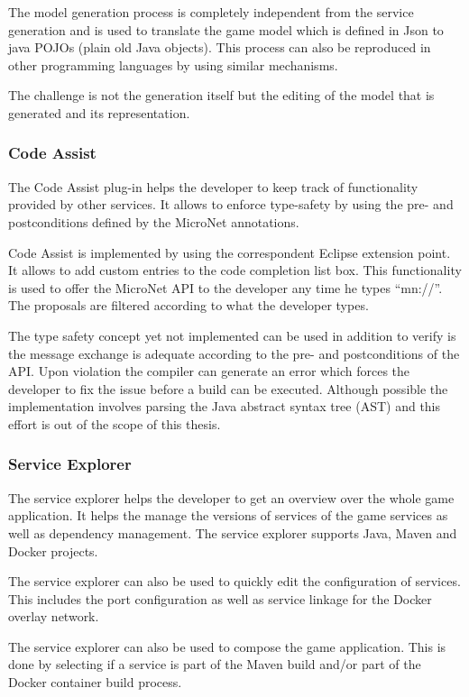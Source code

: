 The model generation process is completely independent from the service
generation and is used to translate the game model which is defined in Json to
java POJOs (plain old Java objects). This process can also be reproduced in
other programming languages by using similar mechanisms. 

The challenge is not the generation itself but the editing of the model that is
generated and its representation. 

\subsubsection{Code Assist}

The Code Assist plug-in helps the developer to keep track of functionality
provided by other services. It allows to enforce type-safety by using the pre-
and postconditions defined by the MicroNet annotations.

Code Assist is implemented by using the correspondent Eclipse extension point.
It allows to add custom entries to the code completion list box. This
functionality is used to offer the MicroNet API to the developer any time he
types ``mn://''. The proposals are filtered according to what the developer
types.

The type safety concept yet not implemented can be used in addition to verify is
the message exchange is adequate according to the pre- and postconditions of the
API. Upon violation the compiler can generate an error which forces the
developer to fix the issue before a build can be executed. Although possible the
implementation involves parsing the Java abstract syntax tree (AST) and this
effort is out of the scope of this thesis.

\subsubsection{Service Explorer}

The service explorer helps the developer to get an overview over the whole
game application. It helps the manage the versions of services of the game
services as well as dependency management. The service explorer supports Java,
Maven and Docker projects.

The service explorer can also be used to quickly edit the configuration of
services. This includes the port configuration as well as service linkage for
the Docker overlay network.

The service explorer can also be used to compose the game application. This is
done by selecting if a service is part of the Maven build and/or part of the
Docker container build process.


